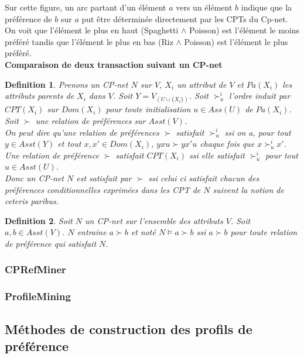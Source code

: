 \documentclass[a4paper,12pt,openany,oneside]{article}
\newtheorem{defn}{Definition} %
\begin{document}
Sur cette figure, un arc partant d'un élément $a$ vers un élément $b$ indique que la préférence de $b$ sur $a$ put être déterminée directement par les CPTs du Cp-net. On voit que l'élément le plus en haut (Spaghetti $\wedge$ Poisson) est l'élément le moins préféré tandis que l'élément le plus en bas (Riz $\wedge$ Poisson) est l'élément le plus préféré.\\

\textbf{Comparaison de deux transaction suivant un CP-net}
\begin{defn}
        Prenons un CP-net $N$ sur $V$, $X_i$ un attribut de $V$ et $Pa(X_i)$ les attributs parents de $X_i$ dans $V$. Soit $Y=V_(U\cup \{X_i\})$. Soit $\succ^i_u$ l'ordre induit par $CPT(X_i)$ sur $Dom(X_i)$ pour toute initialisation $u\in Ass(U)$ de $Pa(X_i)$. Soit $\succ$ une  relation de préférences sur $Asst(V)$.\\
        On peut dire qu'une relation de préférences $\succ$ satisfait $\succ^i_u$ ssi on a, pour tout $y\in Asst(Y)$ et tout $x,x'\in Dom(X_i)$, $yxu\succ yx'u$ chaque fois que $x\succ^i_u x'$.\\
        Une relation de préférence $\succ$ satisfait $CPT(X_i)$ ssi elle satisfait $\succ ^i_u$ pour tout $u\in Asst(U)$.\\
        Donc un CP-net $N$ est satisfait par $\succ$ ssi celui ci satisfait chacun des préférences conditionnelles exprimées dans les CPT de $N$ suivent la notion de ceteris paribus.
\end{defn}

\begin{defn}
        Soit $N$ un CP-net sur l'ensemble des attributs $V$. Soit $a,b\in Asst(V)$. $N$ entraine $a\succ b$ et noté $N\models a\succ b$ ssi $a\succ b$ pour toute relation de préférence qui satisfait $N$.\\
\end{defn}



\subsubsection{CPRefMiner}
\subsubsection{ProfileMining}


\subsection{Méthodes de construction des profils de préférence}
\end{document}
